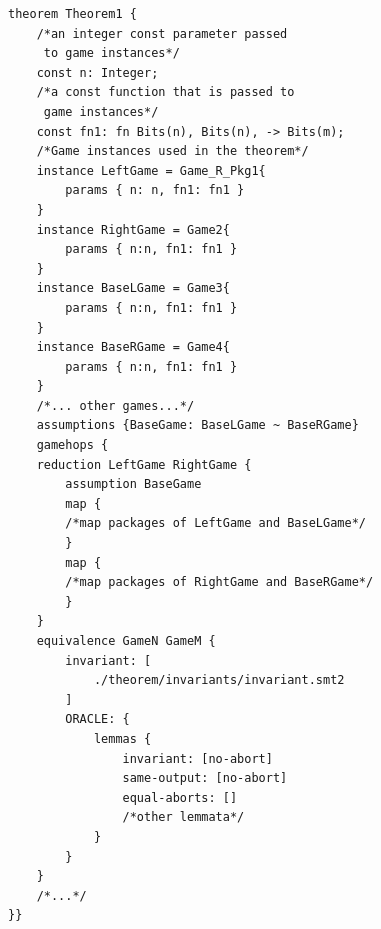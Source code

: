 \begin{longlisting}
\begin{verbatim}
theorem Theorem1 {
    /*an integer const parameter passed 
     to game instances*/
    const n: Integer;
    /*a const function that is passed to 
     game instances*/
    const fn1: fn Bits(n), Bits(n), -> Bits(m);
    /*Game instances used in the theorem*/
    instance LeftGame = Game_R_Pkg1{
        params { n: n, fn1: fn1 }
    }
    instance RightGame = Game2{
        params { n:n, fn1: fn1 }
    }
    instance BaseLGame = Game3{
        params { n:n, fn1: fn1 }
    }
    instance BaseRGame = Game4{
        params { n:n, fn1: fn1 }
    }
    /*... other games...*/
    assumptions {BaseGame: BaseLGame ~ BaseRGame}
    gamehops {
    reduction LeftGame RightGame {
        assumption BaseGame
        map {
        /*map packages of LeftGame and BaseLGame*/
        }
        map {
        /*map packages of RightGame and BaseRGame*/
        }
    }
    equivalence GameN GameM {
        invariant: [
            ./theorem/invariants/invariant.smt2
        ]
        ORACLE: {
            lemmas {
                invariant: [no-abort]
                same-output: [no-abort]
                equal-aborts: []
                /*other lemmata*/
            }
        }
    }
    /*...*/
}}
\end{verbatim}
\caption{Example Domino theorem}
\label{lst:domino-theorem-example}
\end{longlisting}
